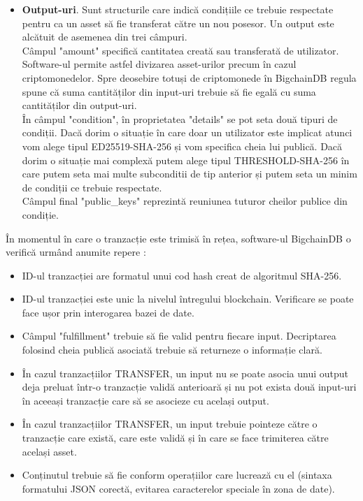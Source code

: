 \begin{itemize}
    \item \textbf{Output-uri}.
    Sunt structurile care indică condițiile ce trebuie respectate pentru ca un asset să fie transferat către un nou posesor.
    Un output este alcătuit de asemenea din trei câmpuri.\\
    
    Câmpul "amount" specifică cantitatea creată sau transferată de utilizator. Software-ul permite astfel divizarea asset-urilor precum în cazul criptomonedelor. Spre deosebire totuși de criptomonede în BigchainDB regula spune că suma cantităților din input-uri trebuie să fie egală cu suma cantităților din output-uri.\\
    
    În câmpul "condition", în proprietatea "details" se pot seta două tipuri de condiții. Dacă dorim o situație în care doar un utilizator este implicat atunci vom alege tipul ED25519-SHA-256 și vom specifica cheia lui publică. Dacă dorim o situație mai complexă putem alege tipul THRESHOLD-SHA-256 în care putem seta mai multe subconditii de tip anterior și putem seta un minim de condiții ce trebuie respectate.\\
    
    Câmpul final "public\_keys" reprezintă reuniunea tuturor cheilor publice din condiție.
    
\end{itemize}

În momentul în care o tranzacție este trimisă în rețea, software-ul BigchainDB o verifică urmând anumite repere \cite{BigchainDB_ReadMe}:
\begin{itemize}
    \item ID-ul tranzacției are formatul unui cod hash creat de  algoritmul SHA-256.
    
    \item ID-ul tranzacției este unic la nivelul întregului blockchain. Verificare se poate face ușor prin interogarea bazei de date.
    
    \item Câmpul "fulfillment" trebuie să fie valid pentru fiecare input. Decriptarea folosind cheia publică asociată trebuie să returneze o informație clară.
    
    \item În cazul tranzacțiilor TRANSFER, un input nu se poate asocia unui output deja preluat într-o tranzacție validă anterioară și nu pot exista două input-uri în aceeași tranzacție care să se asocieze cu același output.
    
    \item În cazul tranzacțiilor TRANSFER, un input trebuie pointeze către o tranzacție care există, care este validă și în care se face trimiterea către același asset.
    
    \item Conținutul trebuie să fie conform operațiilor care lucrează cu el (sintaxa formatului JSON corectă, evitarea caracterelor speciale în zona de date).
\end{itemize}

